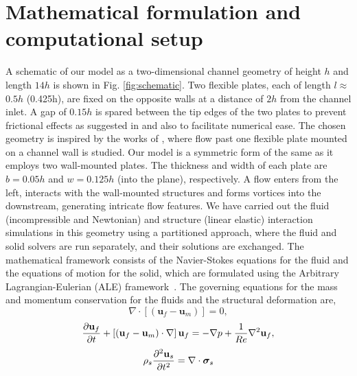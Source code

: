 \documentclass[%
 aip,
 amsmath,amssymb,
 reprint,
]{revtex4-1}
\begin{document}
\section{Mathematical formulation and computational setup}\label{sec:maths}
A schematic of our model as a two-dimensional channel geometry of height $h$ and length $14h$ is shown in Fig. \ref{fig:schematic}. Two flexible plates, each of length $l $$\approx$$ 0.5h$ (0.425h), are fixed on the opposite walls at a distance of $2h$ from the channel inlet. A gap of $0.15h$ is spared between the tip edges of the two plates to prevent frictional effects as suggested in \cite{ Zenit2015} and also to facilitate numerical ease. The chosen geometry is inspired by the works of \cite{ Zenit2014, Zenit2015, Zenit2016}, where flow past one flexible plate mounted on a channel wall is studied. Our model is a symmetric form of the same as it employs two wall-mounted plates. The thickness and width of each plate are $b = 0.05h$ and $w=0.125h$ (into the plane), respectively. A flow enters from the left, interacts with the wall-mounted structures and forms vortices into the downstream, generating intricate flow features. We have carried out the fluid (incompressible and Newtonian) and structure (linear elastic) interaction simulations in this geometry using a partitioned approach, where the fluid and solid solvers are run separately, and their solutions are exchanged. The mathematical framework consists of the Navier-Stokes equations for the fluid and the equations of motion for the solid, which are formulated using the Arbitrary Lagrangian-Eulerian (ALE) framework~\cite{Nguyen2010, Slone2002, CampbellPaterson2011}. 
The governing equations for the mass and momentum conservation for the fluids and the structural deformation are,
\begin{equation*}
	\nabla\cdot\left[(\mathbf{u}_f-\mathbf{u}_m)\right] = 0,
	\end{equation*}\vspace{-1.25cm}
\begin{equation*}
	{\partial\mathbf{u}_f\over\partial t} + \left[(\mathbf{u}_f-\mathbf{u}_m) \cdot\mathbf{\nabla}\right]\mathbf{u}_f = -\nabla p+\frac{1}{Re}\nabla^2\mathbf{u}_f,
\end{equation*}\vspace{-1.25cm}
\begin{equation*}
	\rho_s{\partial^2\mathbf{u}_s\over\partial t^2} = \mathbf{\nabla}\cdot\mathbf{\boldsymbol{\sigma}}_s
\end{equation*}
\end{document}
